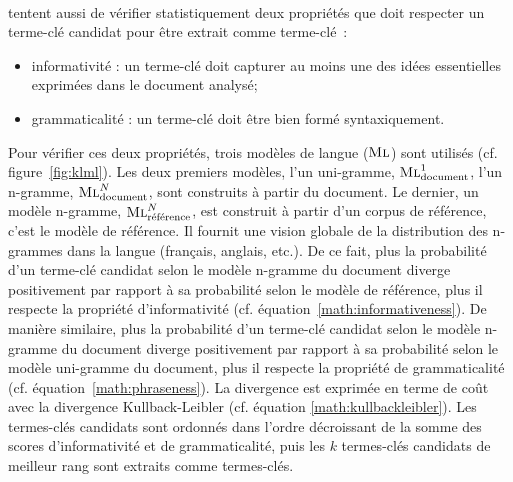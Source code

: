         ~\\ tentent aussi de vérifier
        statistiquement deux propriétés que doit respecter un terme-clé candidat
        pour être extrait comme terme-clé~:
        \begin{itemize}
          \item{informativité : un terme-clé doit capturer au moins une des
                idées essentielles exprimées dans le document analysé;}
          \item{grammaticalité : un terme-clé doit être bien formé
                syntaxiquement.}
        \end{itemize}
        Pour vérifier ces deux propriétés, trois modèles de langue
        ($\textsc{Ml}$) sont utilisés (cf. figure~\ref{fig:klml}). Les deux
        premiers modèles, l'un uni-gramme, $\textsc{Ml}_{\text{document}}^1$,
        l'un n-gramme, $\textsc{Ml}_{\text{document}}^N$, sont construits à
        partir du document. Le dernier, un modèle n-gramme,
        $\textsc{Ml}_{\text{référence}}^N$, est construit à partir d'un corpus
        de référence, c'est le modèle de référence. Il fournit une vision
        globale de la distribution des n-grammes dans la langue (français,
        anglais, etc.). De ce fait, plus la probabilité d'un terme-clé candidat
        selon le modèle n-gramme du document diverge positivement par rapport à
        sa probabilité selon le modèle de référence, plus il respecte la
        propriété d'informativité (cf. équation~\ref{math:informativeness}). De
        manière similaire, plus la probabilité d'un terme-clé candidat selon le
        modèle n-gramme du document diverge positivement par rapport à sa
        probabilité selon le modèle uni-gramme du document, plus il respecte la
        propriété de grammaticalité (cf. équation~\ref{math:phraseness}). La
        divergence est exprimée en terme de coût avec la divergence
        Kullback-Leibler (cf. équation \ref{math:kullbackleibler}). Les
        termes-clés candidats sont ordonnés dans l'ordre décroissant de la somme
        des scores d'informativité et de grammaticalité, puis les $k$
        termes-clés candidats de meilleur rang sont extraits comme termes-clés.

